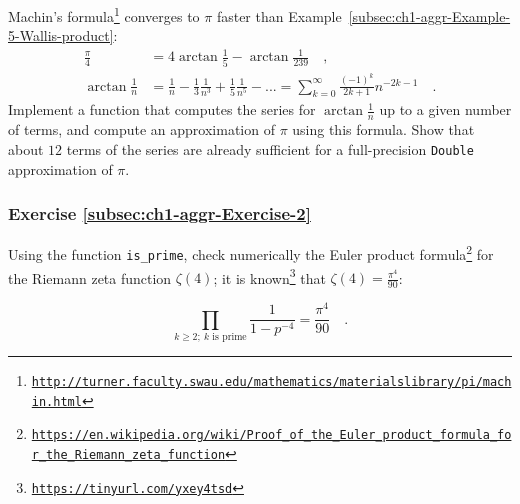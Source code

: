 Machin\textsf{'}s formula\footnote{\texttt{\href{http://turner.faculty.swau.edu/mathematics/materialslibrary/pi/machin.html}{http://turner.faculty.swau.edu/mathematics/materialslibrary/pi/machin.html}}}
converges to $\pi$ faster than Example~\ref{subsec:ch1-aggr-Example-5-Wallis-product}:
\begin{align*}
\frac{\pi}{4} & =4\arctan\frac{1}{5}-\arctan\frac{1}{239}\quad,\\
\arctan\frac{1}{n} & =\frac{1}{n}-\frac{1}{3}\frac{1}{n^{3}}+\frac{1}{5}\frac{1}{n^{5}}-...=\sum_{k=0}^{\infty}\frac{\left(-1\right)^{k}}{2k+1}n^{-2k-1}\quad.
\end{align*}
Implement a function that computes the series for $\arctan\frac{1}{n}$
up to a given number of terms, and compute an approximation of $\pi$
using this formula. Show that about $12$ terms of the series are
already sufficient for a full-precision \lstinline!Double! approximation
of $\pi$.%
\begin{comment}
def at(n: Double, maxN: Int) = (0 to maxN).map(k => 1.0{*}(1 - k \%
2 {*} 2) / (2{*}k+1) / math.pow(n, 2{*}k+1) ).sum ; def p(n: Int)
= 16{*}at(5, n) - 4{*}at(239, n); p(12)
\end{comment}


\subsubsection{Exercise \label{subsec:ch1-aggr-Exercise-2}\ref{subsec:ch1-aggr-Exercise-2}}

Using the function \lstinline!is_prime!, check numerically the Euler
product formula\footnote{\texttt{\href{https://en.wikipedia.org/wiki/Proof_of_the_Euler_product_formula_for_the_Riemann_zeta_function}{https://en.wikipedia.org/wiki/Proof\_of\_the\_Euler\_product\_formula\_for\_the\_Riemann\_zeta\_function}}}
for the Riemann zeta function $\zeta(4)$;
it is known\footnote{\texttt{\href{https://ocw.mit.edu/courses/mathematics/18-104-seminar-in-analysis-applications-to-number-theory-fall-2006/projects/chan.pdf}{https://tinyurl.com/yxey4tsd}}}
that $\zeta(4)=\frac{\pi^{4}}{90}$:%
\begin{comment}
Code: def is\_prime(n: Int) = (2 to n-1).takeWhile(k => k{*}k <= n).forall(k
=> n \% k != 0); def ep(n: Int): Double = (2 to n).filter(is\_prime).map(k
=> 1.0 / (1.0 - 1.0 / k/k/k/k)).product; ep(100); pi{*}pi{*}pi{*}pi/90;
\end{comment}
\[
\prod_{k\geq2;~k\text{ is prime}}\frac{1}{1-p^{-4}}=\frac{\pi^{4}}{90}\quad.
\]


